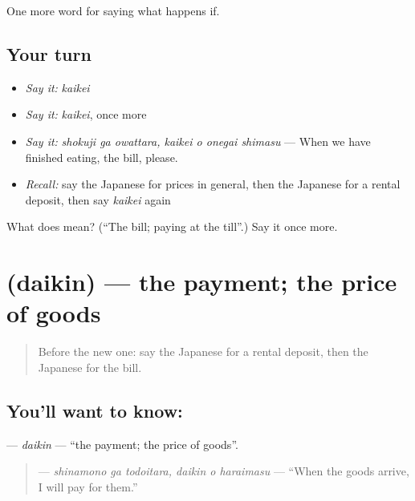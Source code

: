 \begin{grammarlens}[title={What you've built}]
One more word for saying what happens if.
\end{grammarlens}

\subsection*{Your turn}
\begin{itemize}
\raggedright
  \item \emph{Say it:} \emph{kaikei}
  \item \emph{Say it:} \emph{kaikei}, once more
  \item \emph{Say it:} \emph{shokuji ga owattara, kaikei o onegai shimasu} — When we have finished eating, the bill, please.
  \item \emph{Recall:} say the Japanese for prices in general, then the Japanese for a rental deposit, then say \emph{kaikei} again
\end{itemize}

\begin{tcolorbox}[breakable,colback=teal!4,colframe=teal!35!black,title={Before you move on}]
What does  mean? (\textquotedblleft{}The bill; paying at the till\textquotedblright{}.) Say it once more.
\end{tcolorbox}
\section[\texorpdfstring{\ja{だいきん} (daikin)}{だいきん (daikin)}]{ (daikin) — the payment; the price of goods}

\label{lesson:JA-C363-daikin}



\begin{quote}
Before the new one: say the Japanese for a rental deposit, then the Japanese for the bill.
\end{quote}

\subsection*{You'll want to know: }
\textbf{} — \emph{daikin} — \textquotedblleft{}the payment; the price of goods\textquotedblright{}.

\begin{quote}
\textbf{  } — \emph{shinamono ga todoitara, daikin o haraimasu} — \textquotedblleft{}When the goods arrive, I will pay for them.\textquotedblright{}
\end{quote}

